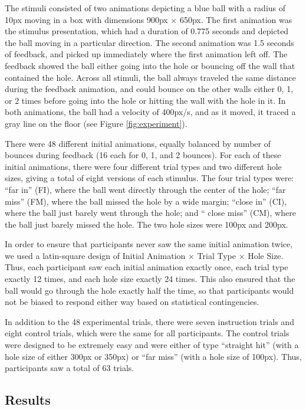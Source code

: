 \documentclass[10pt,letterpaper]{article}
\begin{document}
The stimuli consisted of two animations depicting a blue ball with a radius of 10px moving in a box with dimensions 900px $\times$ 650px.
The first animation was the stimulus presentation, which had a duration of 0.775 seconds and depicted the ball moving in a particular direction.
The second animation was 1.5 seconds of feedback, and picked up immediately where the first animation left off.
The feedback showed the ball either going into the hole or bouncing off the wall that contained the hole.
Across all stimuli, the ball always traveled the same distance during the feedback animation, and could bounce on the other walls either 0, 1, or 2 times before going into the hole or hitting the wall with the hole in it.
In both animations, the ball had a velocity of 400px/s, and as it moved, it traced a gray line on the floor (see Figure \ref{fig:experiment}).

There were 48 different initial animations, equally balanced by number of bounces during feedback (16 each for 0, 1, and 2 bounces). 
For each of these initial animations, there were four different trial types and two different hole sizes, giving a total of eight versions of each stimulus. 
The four trial types were: ``far in'' (FI), where the ball went directly through the center of the hole; ``far miss'' (FM), where the ball missed the hole by a wide margin; ``close in'' (CI), where the ball just barely went through the hole; and `` close miss'' (CM), where the ball just barely missed the hole. 
The two hole sizes were 100px and 200px.

In order to ensure that participants never saw the same initial animation twice, we used a latin-square design of Initial Animation $\times$ Trial Type $\times$ Hole Size.
Thus, each participant saw each initial animation exactly once, each trial type exactly 12 times, and each hole size exactly 24 times.
This also ensured that the ball would go through the hole exactly half the time, so that participants would not be biased to respond either way based on statistical contingencies.

In addition to the 48 experimental trials, there were seven instruction trials and eight control trials, which were the same for all participants.
The control trials were designed to be extremely easy and were either of type ``straight hit'' (with a hole size of either 300px or 350px) or ``far miss'' (with a hole size of 100px).
Thus, participants saw a total of 63 trials.

\subsection{Results}
\end{document}
